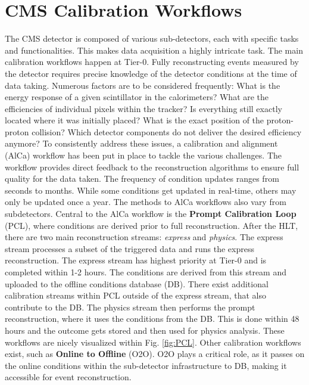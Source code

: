 \section{CMS Calibration Workflows}
The CMS detector is composed of various sub-detectors, each with specific tasks and functionalities. This makes data acquisition a highly intricate task. The main calibration workflows happen at Tier-0. Fully reconstructing events measured by the detector requires precise knowledge of the detector conditions at the time of data taking. Numerous factors are to be considered frequently: What is the energy response of a given scintillator in the calorimeters? What are the efficiencies of individual pixels within the tracker? Is everything still exactly located where it was initially placed? What is the exact position of the proton-proton collision? Which detector components do not deliver the desired efficiency anymore? To consistently address these issues, a calibration and alignment (AlCa) workflow has been put in place to tackle the various challenges. The workflow provides direct feedback to the reconstruction algorithms to ensure full quality for the data taken. The frequency of condition updates ranges from seconds to months. While some conditions get updated in real-time, others may only be updated once a year. The methods to AlCa workflows also vary from subdetectors.
\newline \newline
Central to the AlCa workflow is the \textbf{Prompt Calibration Loop} (PCL), where conditions are derived prior to full reconstruction. After the HLT, there are two main reconstruction streams: \textit{express} and \textit{physics}. The express stream processes a subset of the triggered data and runs the express reconstruction. The express stream has highest priority at Tier-0 and is completed within 1-2 hours. The conditions are derived from this stream and uploaded to the offline conditions database (DB). There exist additional calibration streams within PCL outside of the express stream, that also contribute to the DB.
The physics stream then performs the prompt reconstruction, where it uses the conditions from the DB. This is done within 48 hours and the outcome gets stored and then used for physics analysis. These workflows are nicely visualized within Fig. \ref{fig:PCL}. Other calibration workflows exist, such as \textbf{Online to Offline} (O2O). O2O plays a critical role, as it passes on the online conditions within the sub-detector infrastructure to DB, making it accessible for event reconstruction.
\newline \newline

